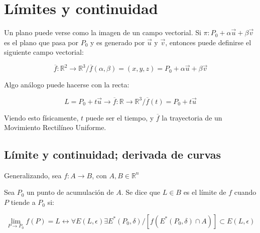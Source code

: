 \documentclass{article}
\renewcommand{\Bbb}{\mathbb}
\begin{document}
\section{Límites y continuidad}

Un plano puede verse como la imagen de un campo vectorial. Si $\pi: P_0 + \alpha \overrightarrow{u} + \beta \overrightarrow{v}$ es el plano que pasa por $P_0$ y es generado por $\overrightarrow{u}$ y $\overrightarrow{v}$, entonces puede definirse el siguiente campo vectorial:

\begin{equation}
\overline{f}: \Bbb R^2 \rightarrow \Bbb R^3 / \overline{f}(\alpha, \beta) = (x, y, z) = P_0 + \alpha \overrightarrow{u} + \beta \overrightarrow{v}
\end{equation}

Algo análogo puede hacerse con la recta:

\begin{equation}
L = P_0 + t \overrightarrow{u} \longrightarrow \overline{f}: \Bbb R \rightarrow \Bbb R^3 / \overline{f}(t) = P_0 + t \overrightarrow{u}
\end{equation}

Viendo esto físicamente, $t$ puede ser el tiempo, y $\overline{f}$ la trayectoria de un Movimiento Rectilíneo Uniforme.

\subsection{Límite y continuidad; derivada de curvas}

Generalizando, sea $f: A \rightarrow B$, con $A, B \in \Bbb R^n$

Sea $P_0$ un punto de acumulación de $A$. Se dice que $L \in B$ es el límite de $f$ cuando $P$ tiende a $P_0$ si:

\begin{equation}
\lim_{P \rightarrow P_0}f(P) = L \longleftrightarrow \forall E(L, \epsilon) \exists E^*(P_0, \delta) / [f(E^*(P_0, \delta) \cap A)] \subset E(L, \epsilon)
\end{equation}
\end{document}
